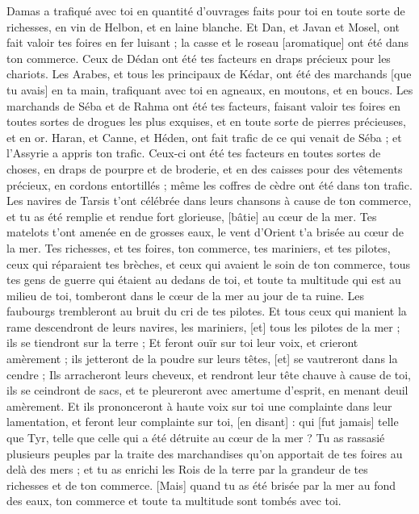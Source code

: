 \begin{multicols}{2}
Damas a trafiqué avec toi en quantité d'ouvrages faits pour toi en toute sorte de richesses, en vin de Helbon, et en laine blanche.
Et Dan, et Javan et Mosel, ont fait valoir tes foires en fer luisant ; la casse et le roseau [aromatique] ont été dans ton commerce.
Ceux de Dédan ont été tes facteurs en draps précieux pour les chariots.
Les Arabes, et tous les principaux de Kédar, ont été des marchands [que tu avais] en ta main, trafiquant avec toi en agneaux, en moutons, et en boucs.
Les marchands de Séba et de Rahma ont été tes facteurs, faisant valoir tes foires en toutes sortes de drogues les plus exquises, et en toute sorte de pierres précieuses, et en or.
Haran, et Canne, et Héden, ont fait trafic de ce qui venait de Séba ; et l'Assyrie a appris ton trafic.
Ceux-ci ont été tes facteurs en toutes sortes de choses, en draps de pourpre et de broderie, et en des caisses pour des vêtements précieux, en cordons entortillés ; même les coffres de cèdre ont été dans ton trafic.
Les navires de Tarsis t'ont célébrée dans leurs chansons à cause de ton commerce, et tu as été remplie et rendue fort glorieuse, [bâtie] au cœur de la mer.
Tes matelots t'ont amenée en de grosses eaux, le vent d'Orient t'a brisée au cœur de la mer.
Tes richesses, et tes foires, ton commerce, tes mariniers, et tes pilotes, ceux qui réparaient tes brèches, et ceux qui avaient le soin de ton commerce, tous tes gens de guerre qui étaient au dedans de toi, et toute ta multitude qui est au milieu de toi, tomberont dans le cœur de la mer au jour de ta ruine.
Les faubourgs trembleront au bruit du cri de tes pilotes.
Et tous ceux qui manient la rame descendront de leurs navires, les mariniers, [et] tous les pilotes de la mer ; ils se tiendront sur la terre ;
Et feront ouïr sur toi leur voix, et crieront amèrement ; ils jetteront de la poudre sur leurs têtes, [et] se vautreront dans la cendre ;
Ils arracheront leurs cheveux, et rendront leur tête chauve à cause de toi, ils se ceindront de sacs, et te pleureront avec amertume d'esprit, en menant deuil amèrement.
Et ils prononceront à haute voix sur toi une complainte dans leur lamentation, et feront leur complainte sur toi, [en disant] : qui [fut jamais] telle que Tyr, telle que celle qui a été détruite au cœur de la mer ?
Tu as rassasié plusieurs peuples par la traite des marchandises qu'on apportait de tes foires au delà des mers ; et tu as enrichi les Rois de la terre par la grandeur de tes richesses et de ton commerce.
[Mais] quand tu as été brisée par la mer au fond des eaux, ton commerce et toute ta multitude sont tombés avec toi.

\end{multicols}
